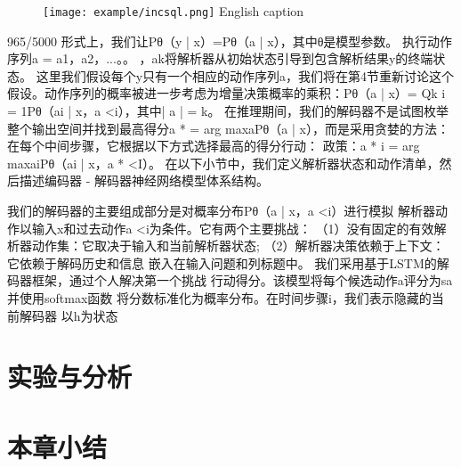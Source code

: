 \begin{figure}[!htp]
  \centering
  \texttt{[image: example/incsql.png]}
    {English caption}
  \label{fig:SRR}
\end{figure}



965/5000
形式上，我们让Pθ（y | x）=Pθ（a | x），其中θ是模型参数。 执行动作序列a = {a1，a2，...。。 ，ak}将解析器从初始状态引导到包含解析结果y的终端状态。 这里我们假设每个y只有一个相应的动作序列a，我们将在第4节重新讨论这个假设。动作序列的概率被进一步考虑为增量决策概率的乘积：Pθ（a | x）= Qk i = 1Pθ（ai | x，a <i），其中| a | = k。
在推理期间，我们的解码器不是试图枚举整个输出空间并找到最高得分a * = arg maxaPθ（a | x），而是采用贪婪的方法：在每个中间步骤，它根据以下方式选择最高的得分行动： 政策：a *
i = arg maxaiPθ（ai
| x，a *
<I）。
在以下小节中，我们定义解析器状态和动作清单，然后描述编码器 - 解码器神经网络模型体系结构。


我们的解码器的主要组成部分是对概率分布Pθ（a | x，a <i）进行模拟
解析器动作以输入x和过去动作a <i为条件。它有两个主要挑战：
（1）没有固定的有效解析器动作集：它取决于输入和当前解析器状态;
（2）解析器决策依赖于上下文：它依赖于解码历史和信息
嵌入在输入问题和列标题中。
我们采用基于LSTM的解码器框架，通过个人解决第一个挑战
行动得分。该模型将每个候选动作a评分为sa并使用softmax函数
将分数标准化为概率分布。在时间步骤i，我们表示隐藏的当前解码器
以h为状态
\section{实验与分析}
\section{本章小结}